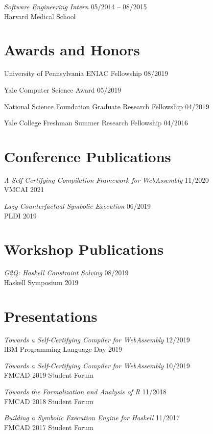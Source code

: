 \documentclass[margin]{res}
\begin{document}
\begin{resume}
\textit{Software Engineering Intern} \hfill 05/2014 -- 08/2015 \\
Harvard Medical School


\section{Awards and Honors}
University of Pennsylvania ENIAC Fellowship \hfill 08/2019

Yale Computer Science Award \hfill 05/2019

National Science Foundation Graduate Research Fellowship \hfill 04/2019

Yale College Freshman Summer Research Fellowship \hfill 04/2016


\section{Conference Publications}
\textit{A Self-Certifying Compilation Framework for WebAssembly} \hfill 11/2020 \\
VMCAI 2021

\textit{Lazy Counterfactual Symbolic Execution} \hfill 06/2019 \\
PLDI 2019

\section{Workshop Publications}

\textit{G2Q: Haskell Constraint Solving} \hfill 08/2019 \\
Haskell Symposium 2019


\section{Presentations}
\textit{Towards a Self-Certifying Compiler for WebAssembly} \hfill 12/2019 \\
  IBM Programming Language Day 2019

\textit{Towards a Self-Certifying Compiler for WebAssembly} \hfill 10/2019 \\
  FMCAD 2019 Student Forum

\textit{Towards the Formalization and Analysis of R} \hfill 11/2018 \\
  FMCAD 2018 Student Forum

\textit{Building a Symbolic Execution Engine for Haskell} \hfill 11/2017 \\
  FMCAD 2017 Student Forum


\end{resume}
\end{document}
